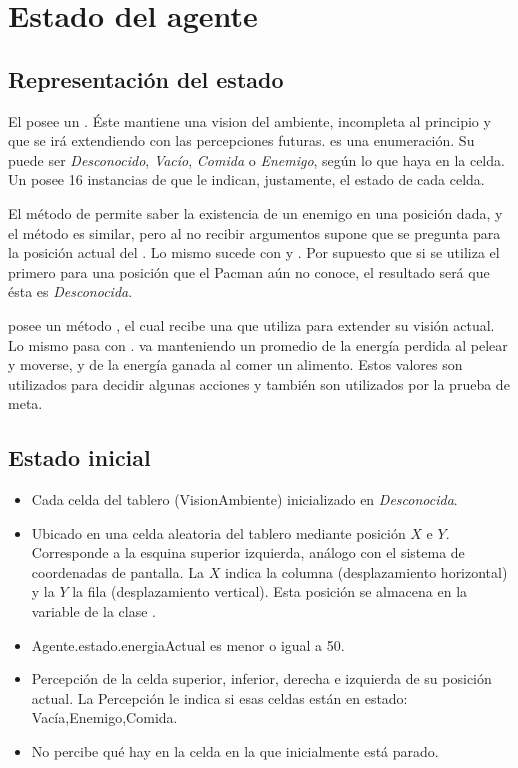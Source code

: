 \section{Estado del agente}

\subsection{Representación del estado}

El  posee un . Éste mantiene una vision del
ambiente, incompleta al principio y que se irá extendiendo con las percepciones
futuras.   es una enumeración. Su  puede ser
\emph{Desconocido}, \emph{Vacío}, \emph{Comida} o \emph{Enemigo}, según lo que
haya en la celda. Un  posee 16 instancias de 
que le indican, justamente, el estado de cada celda.

El método  de  permite saber la
existencia de un enemigo en una posición dada, y el método
 es similar, pero al no recibir argumentos supone que se
pregunta para la posición actual del . Lo mismo sucede con
 y . Por supuesto que si se
utiliza el primero para una posición que el Pacman aún no conoce, el resultado
será que ésta es \emph{Desconocida}.

 posee un método , el cual recibe una
 que utiliza para extender su visión actual. Lo mismo pasa
con .  va manteniendo un promedio de la
energía perdida al pelear y moverse, y de la energía ganada al comer un
alimento. Estos valores son utilizados para decidir algunas acciones y también
son utilizados por la prueba de meta.

\subsection{Estado inicial}

\begin{itemize}
\item Cada celda del tablero (VisionAmbiente) inicializado en
\emph{Desconocida}.
\item Ubicado en una celda aleatoria del tablero mediante posición $X$ e $Y$.
Corresponde a la esquina superior izquierda, análogo con el sistema de
coordenadas de pantalla. La $X$ indica la columna (desplazamiento horizontal) y
la $Y$ la fila (desplazamiento vertical). Esta posición se almacena en la
variable  de la clase .
\item Agente.estado.energiaActual es menor o igual a 50.
\item Percepción de la celda superior, inferior, derecha e izquierda de su
posición actual. La Percepción le indica si esas celdas están en estado:
Vacía,Enemigo,Comida.
\item No percibe qué hay en la celda en la que inicialmente está parado.
\end{itemize}

